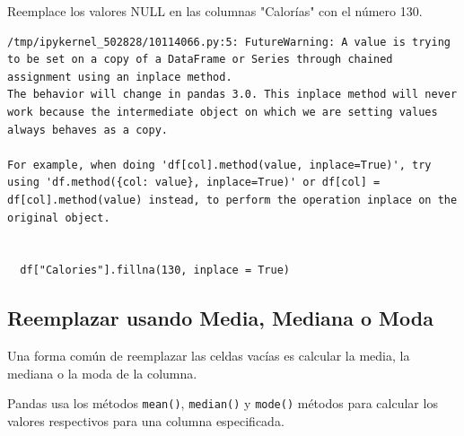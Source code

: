 \begin{code} Reemplace los valores NULL en las columnas "Calorías" con el número 130.

\begin{Shaded}
\begin{Highlighting}[]

\OperatorTok{=}\NormalTok{)}

\NormalTok{df[}\NormalTok{].fillna(}\OperatorTok{=} \NormalTok{)}
\end{Highlighting}
\end{Shaded}

\begin{verbatim}
/tmp/ipykernel_502828/10114066.py:5: FutureWarning: A value is trying to be set on a copy of a DataFrame or Series through chained assignment using an inplace method.
The behavior will change in pandas 3.0. This inplace method will never work because the intermediate object on which we are setting values always behaves as a copy.

For example, when doing 'df[col].method(value, inplace=True)', try using 'df.method({col: value}, inplace=True)' or df[col] = df[col].method(value) instead, to perform the operation inplace on the original object.


  df["Calories"].fillna(130, inplace = True)
\end{verbatim}
\end{code}

\subsection{Reemplazar usando Media, Mediana o Moda}

Una forma común de reemplazar las celdas vacías es calcular la media, la
mediana o la moda de la columna.

Pandas usa los métodos \texttt{mean()}, \texttt{median()} y
\texttt{mode()} métodos para calcular los valores respectivos para una
columna especificada.\\

